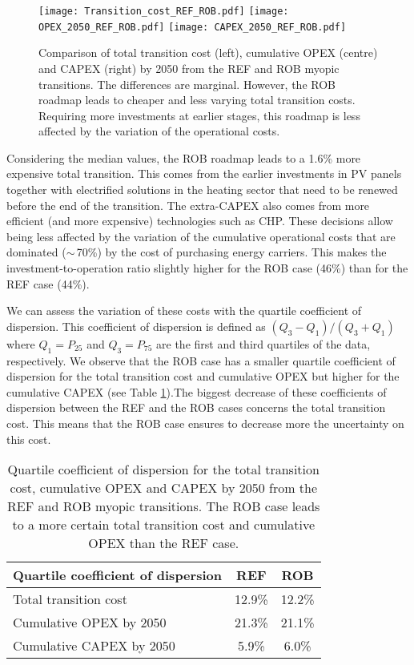 \begin{figure}[!htbp]
\centering
\texttt{[image: Transition\_cost\_REF\_ROB.pdf]}
\texttt{[image: OPEX\_2050\_REF\_ROB.pdf]}
\texttt{[image: CAPEX\_2050\_REF\_ROB.pdf]}
\caption{Comparison of total transition cost (left), cumulative OPEX (centre) and CAPEX (right) by 2050 from the REF and ROB myopic transitions. The differences are marginal. However, the ROB roadmap leads to cheaper and less varying total transition costs. Requiring more investments at earlier stages, this roadmap is less affected by the variation of the operational costs.}
\label{fig:Total_Opex_Capex_REF_ROB}
\end{figure}

Considering the median values, the ROB roadmap leads to a 1.6\% more expensive total transition. This comes from the earlier investments in \gls{PV} panels together with electrified solutions in the heating sector that need to be renewed before the end of the transition. The extra-\gls{CAPEX} also comes from more efficient (and more expensive) technologies such as \gls{CHP}. These decisions allow being less affected by the variation of the cumulative operational costs that are dominated ($\sim$\,70\%) by the cost of purchasing energy carriers.  This makes the investment-to-operation ratio slightly higher for the ROB case (46\%) than for the REF case (44\%). 

We can assess the variation of these costs with the quartile coefficient of dispersion. This coefficient of dispersion is defined as $\left(Q_3-Q_1 \right)/\left(Q_3+Q_1 \right)$ where $Q_1=P_{25}$ and $Q_3=P_{75}$ are the first and third quartiles of the data, respectively. We observe that the ROB case has a smaller quartile coefficient of dispersion for the total transition cost and cumulative \gls{OPEX} but higher for the cumulative \gls{CAPEX} (see Table \ref{tab:quartile_coeff_dispersion}).The biggest decrease of these coefficients of dispersion between the REF and the ROB cases concerns the total transition cost. This means that the ROB case ensures to decrease more the uncertainty on this cost. 



\begin{table}[htbp!]
\caption{Quartile coefficient of dispersion for the total transition cost, cumulative OPEX and CAPEX by 2050 from the REF and ROB myopic transitions. The ROB case leads to a more certain total transition cost and cumulative \gls{OPEX} than the REF case.}
\label{tab:quartile_coeff_dispersion}
\centering
\begin{tabular}{l| c c}
\toprule
\textbf{Quartile coefficient of dispersion} &  REF  & ROB \\
\midrule
Total transition cost & 12.9\% & 12.2\%  \\
Cumulative \gls{OPEX} by 2050 & 21.3\% & 21.1\% \\
Cumulative \gls{CAPEX} by 2050 & 5.9\% & 6.0\%\\
\bottomrule							
\end{tabular}
\end{table}

